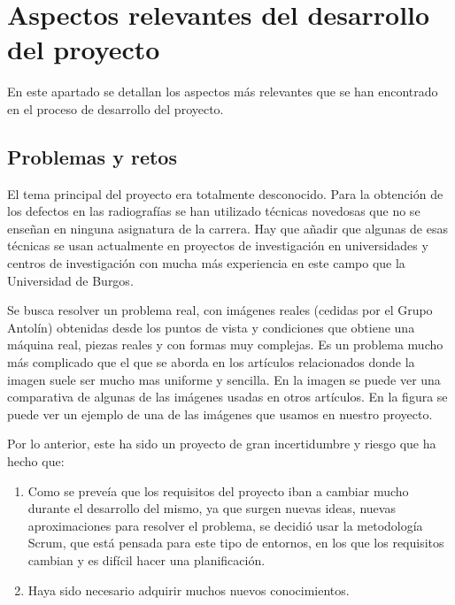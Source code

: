\chapter{Aspectos relevantes del desarrollo del proyecto}

En este apartado se detallan los aspectos más relevantes que se han encontrado en el proceso de desarrollo del proyecto.

\section{Problemas y retos}
El tema principal del proyecto era totalmente desconocido. Para la obtención de los defectos en las radiografías se han utilizado técnicas novedosas que no se enseñan en ninguna asignatura de la carrera. Hay que añadir que algunas de esas técnicas se usan actualmente en proyectos de investigación en universidades y centros de investigación con mucha más experiencia en este campo que la Universidad de Burgos.

Se busca resolver un problema real, con imágenes reales (cedidas por el Grupo Antolín) obtenidas desde los puntos de vista y condiciones que obtiene una máquina real, piezas reales y con formas muy complejas. Es un problema mucho más complicado que el que se aborda en los artículos relacionados donde la imagen suele ser mucho mas uniforme y sencilla. En la imagen  se puede ver una comparativa de algunas de las imágenes usadas en otros artículos. En la figura  se puede ver un ejemplo de una de las imágenes que usamos en nuestro proyecto.

Por lo anterior, este ha sido un proyecto de gran incertidumbre y riesgo que ha hecho que:

\begin{enumerate}
\item Como se preveía que los requisitos del proyecto iban a cambiar mucho durante el desarrollo del mismo, ya que surgen nuevas ideas, nuevas aproximaciones para resolver el problema, se decidió usar la metodología Scrum, que está pensada para este tipo de entornos, en los que los requisitos cambian y es difícil hacer una planificación.

\item Haya sido necesario adquirir muchos nuevos conocimientos.
\end{enumerate}

